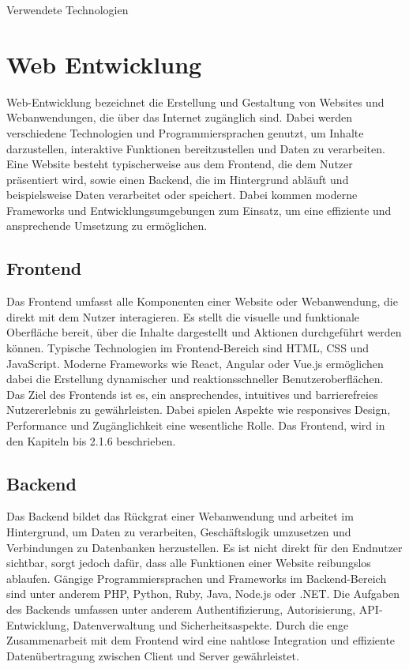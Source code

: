 \begin{inhalt}
\renewcommand*\chapterpagestyle{scrheadings}

Verwendete Technologien 
\section{Web Entwicklung}

Web-Entwicklung \cite{WebEntwicklung} bezeichnet die Erstellung und Gestaltung von Websites und Webanwendungen, die über das Internet zugänglich sind. Dabei werden verschiedene Technologien und Programmiersprachen genutzt, um Inhalte darzustellen, interaktive Funktionen bereitzustellen und Daten zu verarbeiten. Eine Website besteht typischerweise aus dem Frontend, die dem Nutzer präsentiert wird, sowie einen Backend, die im Hintergrund abläuft und beispielsweise Daten verarbeitet oder speichert. Dabei kommen moderne Frameworks und Entwicklungsumgebungen zum Einsatz, um eine effiziente und ansprechende Umsetzung zu ermöglichen. 

\subsection{Frontend} 

Das Frontend \cite{FrontendBackend} umfasst alle Komponenten einer Website oder Webanwendung, die direkt mit dem Nutzer interagieren. Es stellt die visuelle und funktionale Oberfläche bereit, über die Inhalte dargestellt und Aktionen durchgeführt werden können. Typische Technologien im Frontend-Bereich sind HTML, CSS und JavaScript. Moderne Frameworks wie React, Angular oder Vue.js ermöglichen dabei die Erstellung dynamischer und reaktionsschneller Benutzeroberflächen. Das Ziel des Frontends ist es, ein ansprechendes, intuitives und barrierefreies Nutzererlebnis zu gewährleisten. Dabei spielen Aspekte wie responsives Design, Performance und Zugänglichkeit eine wesentliche Rolle. Das Frontend, wird in den Kapiteln bis 2.1.6 beschrieben. 

\subsection{Backend}

Das Backend \cite{FrontendBackend} bildet das Rückgrat einer Webanwendung und arbeitet im Hintergrund, um Daten zu verarbeiten, Geschäftslogik umzusetzen und Verbindungen zu Datenbanken herzustellen. Es ist nicht direkt für den Endnutzer sichtbar, sorgt jedoch dafür, dass alle Funktionen einer Website reibungslos ablaufen. Gängige Programmiersprachen und Frameworks im Backend-Bereich sind unter anderem PHP, Python, Ruby, Java, Node.js oder .NET. Die Aufgaben des Backends umfassen unter anderem Authentifizierung, Autorisierung, API-Entwicklung, Datenverwaltung und Sicherheitsaspekte. Durch die enge Zusammenarbeit mit dem Frontend wird eine nahtlose Integration und effiziente Datenübertragung zwischen Client und Server gewährleistet.


\end{inhalt}

